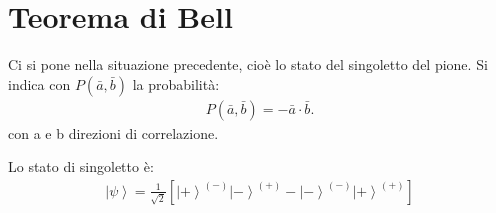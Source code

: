 \section{Teorema di Bell} %
Ci si pone nella situazione precedente, cioè lo stato del singoletto del pione. Si indica con $P\left(\bar a,\bar b\right)$ la probabilità:
\begin{equation}\begin{split}
P\left(\bar a,\bar b\right)=-\bar a\cdot \bar b.
\end{split}\end{equation}
con a e b direzioni di correlazione.

Lo stato di singoletto è:
\begin{equation}\begin{split}
\left |\psi  \right\rangle=\frac{1}{\sqrt{2}}\left[\left |+ \right\rangle^{\left(-\right)}\left |- \right\rangle^{\left(+\right)}-\left |- \right\rangle^{\left(-\right)}\left |+ \right\rangle^{\left(+\right)}\right]
\end{split}\end{equation}

